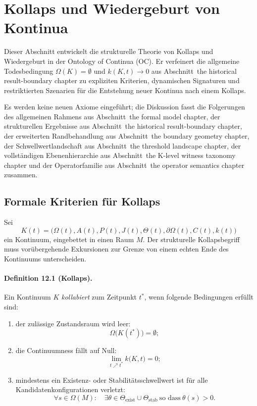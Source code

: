 
\section{Kollaps und Wiedergeburt von Kontinua}
\label{sec:collapse-rebirth}

Dieser Abschnitt entwickelt die strukturelle Theorie von Kollaps und
Wiedergeburt in der Ontology of Continua (OC). Er verfeinert die allgemeine
Todesbedingung \(\Omega(K)=\emptyset\) und \(k(K,t)\to 0\) aus
Abschnitt~the historical result-boundary chapter zu expliziten Kriterien, dynamischen Signaturen und
restriktierten Szenarien für die Entstehung neuer Kontinua nach einem Kollaps.

Es werden keine neuen Axiome eingeführt; die Diskussion fasst die
Folgerungen des allgemeinen Rahmens aus Abschnitt~the formal model chapter, der
strukturellen Ergebnisse aus Abschnitt~the historical result-boundary chapter, der erweiterten
Randbehandlung aus Abschnitt~the boundary geometry chapter, der
Schwellwertlandschaft aus Abschnitt~the threshold landscape chapter, der
vollständigen Ebenenhierarchie aus Abschnitt~the K-level witness taxonomy chapter und der
Operatorfamilie aus Abschnitt~the operator semantics chapter zusammen.

\subsection{Formale Kriterien für Kollaps}

Sei
\[
  K(t) =
  \big(
    \Omega(t), A(t), P(t), J(t),
    \Theta(t), \partial\Omega(t), C(t), k(t)
  \big)
\]
ein Kontinuum, eingebettet in einen Raum \(M\). Der strukturelle Kollapsbegriff
muss vorübergehende Exkursionen zur Grenze von einem echten Ende des
Kontinuums unterscheiden.

\paragraph{Definition 12.1 (Kollaps).}
Ein Kontinuum \(K\) \emph{kollabiert} zum Zeitpunkt \(t^{\ast}\), wenn folgende
Bedingungen erfüllt sind:
\begin{enumerate}
  \item der zulässige Zustandsraum wird leer:
        \[
          \Omega\big(K(t^{\ast})\big) = \emptyset;
        \]
  \item die Continuumness fällt auf Null:
        \[
          \lim_{t \nearrow t^{\ast}} k\big(K,t\big) = 0;
        \]
  \item mindestens ein Existenz- oder Stabilitätsschwellwert ist für alle
        Kandidatenkonfigurationen verletzt:
        \[
          \forall s \in \Omega(M):
          \quad
          \exists \theta \in \Theta_{\mathrm{exist}} \cup \Theta_{\mathrm{stab}}
          \ \text{so dass}\ \theta(s) > 0.
        \]
\end{enumerate}

